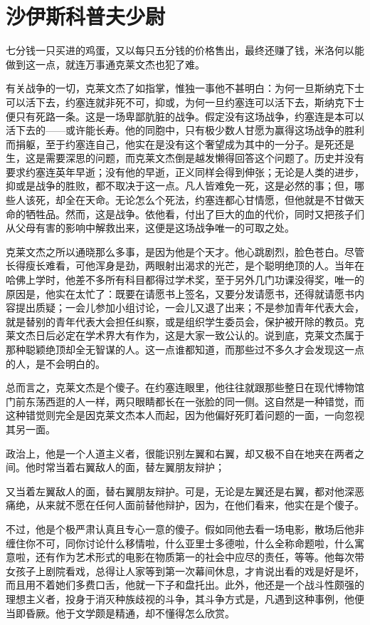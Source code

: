 \chapter{沙伊斯科普夫少尉}
 
    七分钱一只买进的鸡蛋，又以每只五分钱的价格售出，最终还赚了钱，米洛何以能做到这一点，就连万事通克莱文杰也犯了难。

    有关战争的一切，克莱文杰了如指掌，惟独一事他不甚明白：为何一旦斯纳克下士可以活下去，约塞连就非死不可，抑或，为何一旦约塞连可以活下去，斯纳克下士便只有死路一条。这是一场卑鄙肮脏的战争。假定没有这场战争，约塞连是本可以活下去的——或许能长寿。他的同胞中，只有极少数人甘愿为赢得这场战争的胜利而捐躯，至于约塞连自己，他实在是没有这个奢望成为其中的一分子。是死还是生，这是需要深思的问题，而克莱文杰倒是越发懒得回答这个问题了。历史并没有要求约塞连英年早逝；没有他的早逝，正义同样会得到伸张；无论是人类的进步，抑或是战争的胜败，都不取决于这一点。凡人皆难免一死，这是必然的事；但，哪些人该死，却全在天命。无论怎么个死法，约塞连都心甘情愿，但他就是不甘做天命的牺牲品。然而，这是战争。依他看，付出了巨大的血的代价，同时又把孩子们从父母有害的影响中解救出来，这便是这场战争唯一的可取之处。

    克莱文杰之所以通晓那么多事，是因为他是个天才。他心跳剧烈，脸色苍白。尽管长得瘦长难看，可他浑身是劲，两眼射出渴求的光芒，是个聪明绝顶的人。当年在哈佛上学时，他差不多所有科目都得过学术奖，至于另外几门功课没得奖，唯一的原因是，他实在太忙了：既要在请愿书上签名，又要分发请愿书，还得就请愿书内容提出质疑；一会儿参加小组讨论，一会儿又退了出来；不是参加青年代表大会，就是替别的青年代表大会担任纠察，或是组织学生委员会，保护被开除的教员。克莱文杰日后必定在学术界大有作为，这是大家一致公认的。说到底，克莱文杰属于那种聪颖绝顶却全无智谋的人。这一点谁都知道，而那些过不多久才会发现这一点的人，是不会明白的。

    总而言之，克莱文杰是个傻子。在约塞连眼里，他往往就跟那些整日在现代博物馆门前东荡西逛的人一样，两只眼睛都长在一张脸的同一侧。这自然是一种错觉，而这种错觉则完全是因克莱文杰本人而起，因为他偏好死盯着问题的一面，一向忽视其另一面。

    政治上，他是一个人道主义者，很能识别左翼和右翼，却又极不自在地夹在两者之间。他时常当着右翼敌人的面，替左翼朋友辩护；

 


    又当着左翼敌人的面，替右翼朋友辩护。可是，无论是左翼还是右翼，都对他深恶痛绝，从来就不愿在任何人面前替他辩护，因为，在他们看来，他实在是个傻子。

    不过，他是个极严肃认真且专心一意的傻子。假如同他去看一场电影，散场后他非缠住你不可，同你讨论什么移情啦，什么亚里士多德啦，什么全称命题啦，什么寓意啦，还有作为艺术形式的电影在物质第一的社会中应尽的责任，等等。他每次带女孩子上剧院看戏，总得让人家等到第一次幕间休息，才肯说出看的戏是好是坏，而且用不着她们多费口舌，他就一下子和盘托出。此外，他还是一个战斗性颇强的理想主义者，投身于消灭种族歧视的斗争，其斗争方式是，凡遇到这种事例，他便当即昏厥。他于文学颇是精通，却不懂得怎么欣赏。

